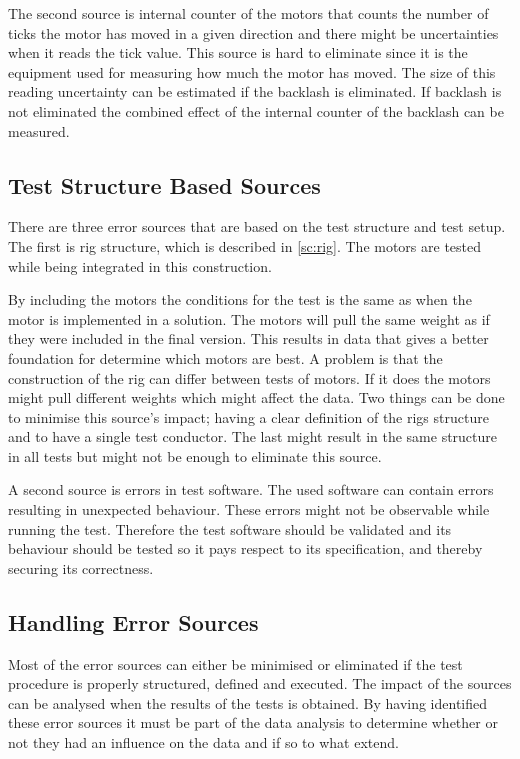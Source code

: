 The second source is internal counter of the motors that counts the number of ticks the motor has moved in a given direction and there might be uncertainties when it reads the tick value. This source is hard to eliminate since it is the equipment used for measuring how much the motor has moved. The size of this reading uncertainty can be estimated if the backlash is eliminated. If backlash is not eliminated the combined effect of the internal counter of the backlash can be measured.

\subsection{Test Structure Based Sources}
There are three error sources that are based on the test structure and test setup. The first is rig structure, which is described in \cref{sc:rig}. The motors are tested while being integrated in this construction.

By including the motors the conditions for the test is the same as when the motor is implemented in a solution. The motors will pull the same weight as if they were included in the final version. This results in data that gives a better foundation for determine which motors are best. A problem is that the construction of the rig can differ between tests of motors. If it does the motors might pull different weights which might affect the data. Two things can be done to minimise this source's impact; having a clear definition of the rigs structure and to have a single test conductor. The last might result in the same structure in all tests but might not be enough to eliminate this source.

A second source is errors in test software. The used software can contain errors resulting in unexpected behaviour. These errors might not be observable while running the test. Therefore the test software should be validated and its behaviour should be tested so it pays respect to its specification, and thereby securing its correctness.

\subsection{Handling Error Sources}
Most of the error sources can either be minimised or eliminated if the test procedure is properly structured, defined and executed. The impact of the sources can be analysed when the results of the tests is obtained. By having identified these error sources it must be part of the data analysis to determine whether or not they had an influence on the data and if so to what extend.

